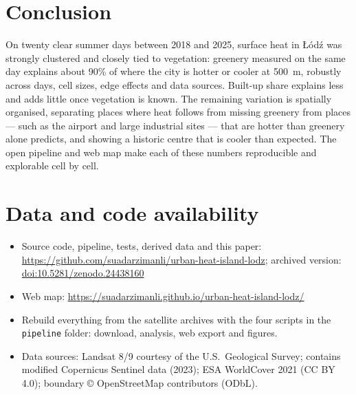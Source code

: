 \documentclass[11pt,a4paper]{article}
\newcommand{\repourl}{https://github.com/suadarzimanli/urban-heat-island-lodz}
\newcommand{\appurl}{https://suadarzimanli.github.io/urban-heat-island-lodz/}
\newcommand{\archivedoi}{; archived version: \href{https://doi.org/10.5281/zenodo.24438160}{doi:10.5281/zenodo.24438160}}
\begin{document}
\section{Conclusion}

On twenty clear summer days between 2018 and 2025, surface heat in Łódź was strongly clustered and closely tied to vegetation: greenery measured on the same day explains about 90\% of where the city is hotter or cooler at 500~m, robustly across days, cell sizes, edge effects and data sources. Built-up share explains less and adds little once vegetation is known. The remaining variation is spatially organised, separating places where heat follows from missing greenery from places --- such as the airport and large industrial sites --- that are hotter than greenery alone predicts, and showing a historic centre that is cooler than expected. The open pipeline and web map make each of these numbers reproducible and explorable cell by cell.

\section*{Data and code availability}

\begin{itemize}[leftmargin=1.2em]
  \item Source code, pipeline, tests, derived data and this paper: \url{\repourl}\archivedoi
  \item Web map: \url{\appurl}
  \item Rebuild everything from the satellite archives with the four scripts in the \texttt{pipeline} folder: download, analysis, web export and figures.
  \item Data sources: Landsat 8/9 courtesy of the U.S.\ Geological Survey; contains modified Copernicus Sentinel data (2023); ESA WorldCover 2021 (CC BY 4.0); boundary © OpenStreetMap contributors (ODbL).
\end{itemize}
\end{document}
